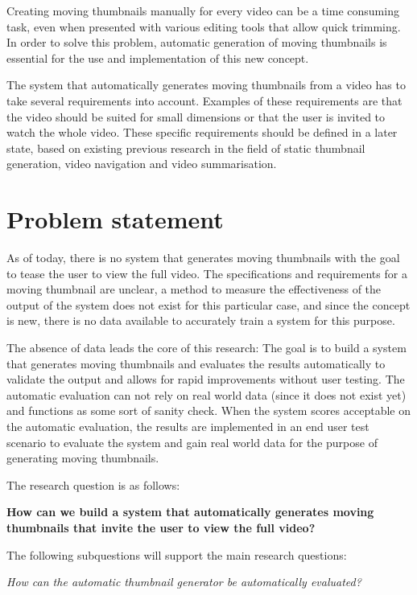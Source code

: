 \documentclass{../resources/acm_proc_article-sp}
\begin{document}
Creating moving thumbnails manually for every video can be a time consuming task, even when presented with various editing tools that allow quick trimming. In order to solve this problem,  automatic generation of moving thumbnails is essential for the use and implementation of this new concept.

The system that automatically generates moving thumbnails from a video has to take several requirements into account. Examples of these requirements are that the video should be suited for small dimensions or that the user is invited to watch the whole video. These specific requirements should be defined in a later state, based on existing previous research in the field of static thumbnail generation, video navigation and video summarisation.

\section{Problem statement}
\label{sec:problem statement}

As of today, there is no system that generates moving thumbnails with the goal to tease the user to view the full video. The specifications and requirements for a moving thumbnail are unclear, a method to measure the effectiveness of the output of the system does not exist for this particular case, and since the concept is new, there is no data available to accurately train a system for this purpose.

The absence of data leads the core of this research: The goal is to build a system that generates moving thumbnails and evaluates the results automatically to validate the output and allows for rapid improvements without user testing. The automatic evaluation can not rely on real world data (since it does not exist yet) and functions as some sort of sanity check. When the system scores acceptable on the automatic evaluation, the results are implemented in an end user test scenario to evaluate the system and gain real world data for the purpose of generating moving thumbnails.

The research question is as follows:

\textbf{How can we build a system that automatically generates moving thumbnails that invite the user to view the full video?}

The following subquestions will support the main research questions:

\textit{How can the automatic thumbnail generator be automatically evaluated?}
\end{document}
